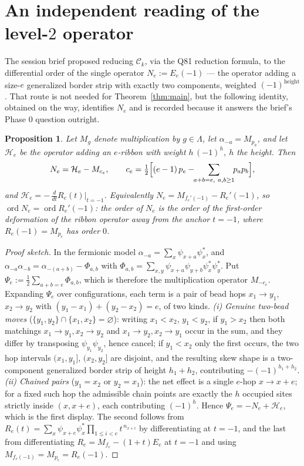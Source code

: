 \documentclass[11pt]{article}
\newtheorem{proposition}[theorem]{Proposition}
\theoremstyle{definition}
\newcommand{\Ck}{\mathcal{C}}
\DeclareMathOperator{\ord}{ord}
\begin{document}
\section{An independent reading of the level-$2$ operator}

The session brief proposed reducing $\Ck_k$, via the Q81 reduction formula, to the differential
order of the single operator $N_e:=E_e(-1)$ --- the operator adding a size-$e$ generalized
border strip with exactly two components, weighted $(-1)^{\mathrm{height}}$.  That route is not
needed for Theorem~\ref{thm:main}, but the following identity, obtained on the way, identifies
$N_e$ and is recorded because it answers the brief's Phase 0 question outright.

\begin{proposition}\label{prop:N}
Let $M_g$ denote multiplication by $g\in\Lambda$, let $\alpha_{-a}=M_{p_a}$, and let
$\mathcal H_e$ be the operator adding an $e$-ribbon with weight $h\,(-1)^{h}$, $h$ the height.
Then
\[
  N_e=\mathcal H_e-M_{c_e},\qquad
  c_e=\tfrac12\Bigl[(e-1)\,p_e-\!\!\sum_{a+b=e,\ a,b\ge1}\!\!p_a p_b\Bigr],
\]
and $\mathcal H_e=-\,\tfrac{d}{dt}R_e(t)\big|_{t=-1}$.  Equivalently
$N_e=M_{f_e'(-1)}-R_e'(-1)$, so $\ord N_e=\ord R_e'(-1)$: the order of $N_e$ is the order of
the first-order deformation of the ribbon operator away from the anchor $t=-1$, where
$R_e(-1)=M_{p_e}$ has order $0$.
\end{proposition}

\begin{proof}[Proof sketch]
In the fermionic model $\alpha_{-a}=\sum_x\psi_{x+a}\psi^*_x$, and
$\alpha_{-a}\alpha_{-b}=\alpha_{-(a+b)}-\Phi_{a,b}$ with
$\Phi_{a,b}=\sum_{x,y}\psi_{x+a}\psi_{y+b}\psi^*_x\psi^*_y$.  Put
$\Psi_e:=\tfrac12\sum_{a+b=e}\Phi_{a,b}$, which is therefore the multiplication operator
$M_{-c_e}$.  Expanding $\Psi_e$ over configurations, each term is a pair of bead hops
$x_1\to y_1$, $x_2\to y_2$ with $(y_1-x_1)+(y_2-x_2)=e$, of two kinds.  \emph{(i) Genuine
two-bead moves} ($\{y_1,y_2\}\cap\{x_1,x_2\}=\varnothing$): writing $x_1<x_2$, $y_1<y_2$, if
$y_1>x_2$ then both matchings $x_1\to y_1,x_2\to y_2$ and $x_1\to y_2,x_2\to y_1$ occur in the
sum, and they differ by transposing $\psi_{y_1}\psi_{y_2}$, hence cancel; if $y_1<x_2$ only the
first occurs, the two hop intervals $(x_1,y_1]$, $(x_2,y_2]$ are disjoint, and the resulting
skew shape is a two-component generalized border strip of height $h_1+h_2$, contributing
$-(-1)^{h_1+h_2}$.  \emph{(ii) Chained pairs} ($y_1=x_2$ or $y_2=x_1$): the net effect is a
single $e$-hop $x\to x+e$; for a fixed such hop the admissible chain points are exactly the
$h$ occupied sites strictly inside $(x,x+e)$, each contributing $(-1)^{h}$.  Hence
$\Psi_e=-N_e+\mathcal H_e$, which is the first display.  The second follows from
$R_e(t)=\sum_x\psi_{x+e}\psi^*_x\prod_{1\le i<e}t^{\,n_{x+i}}$ by differentiating at $t=-1$,
and the last from differentiating $R_e=M_{f_e}-(1+t)E_e$ at $t=-1$ and using
$M_{f_e(-1)}=M_{p_e}=R_e(-1)$.
\end{proof}
\end{document}

